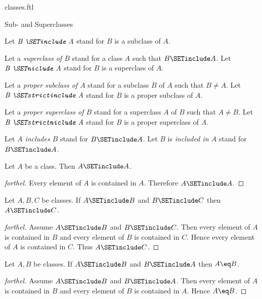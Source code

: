 \documentclass{naproche-library}
\begin{document}
\begin{smodule}[title=Classes]{classes.ftl}
\begin{sfragment}{Sub- and Superclasses}
\begin{definition}[forthel,id=FOUNDATIONS_01_3275578358628352]
    Let $\emph{B \SETinclude A}$ stand for $B$ is a subclass of $A$.

    Let a \emph{superclass of $B$} stand for a class $A$ such that $B \SETinclude A$.
    Let $\emph{B \SETniclude A}$ stand for $B$ is a superclass of $A$.

    Let a \emph{proper subclass of $A$} stand for a subclass $B$ of $A$ such that $B \neq A$.
    Let $\emph{B \SETstrictinclude A}$ stand for $B$ is a proper subclass of $A$.

    Let a \emph{proper superclass of $B$} stand for a superclass $A$ of $B$ such that $A \neq B$.
    Let $\emph{B \SETstrictniclude A}$ stand for $B$ is a proper superclass of $A$.

    Let \emph{$A$ includes $B$} stand for $B \SETinclude A$.
    Let $B$ is \emph{included in $A$} stand for $B \SETinclude A$.
  \end{definition}

  \begin{proposition}[forthel,id=FOUNDATIONS_01_5994555614691328]
    Let $A$ be a class.
    Then $A \SETinclude A$.
  \end{proposition}
  \begin{proof}[forthel]
    Every element of $A$ is contained in $A$.
    Therefore $A \SETinclude A$.
  \end{proof}

  \begin{proposition}[forthel,id=FOUNDATIONS_01_3939677545431040]
    Let $A, B, C$ be classes.
    If $A \SETinclude B$ and $B \SETinclude C$ then $A \SETinclude C$.
  \end{proposition}
  \begin{proof}[forthel]
    Assume $A \SETinclude B$ and $B \SETinclude C$.
    Then every element of $A$ is contained in $B$ and every element of $B$ is contained in $C$.
    Hence every element of $A$ is contained in $C$.
    Thus $A \SETinclude C$.
  \end{proof}

  \begin{proposition}[forthel,id=FOUNDATIONS_01_7159957847801856]
    Let $A, B$ be classes.
    If $A \SETinclude B$ and $B \SETinclude A$ then $A \eq B$.
  \end{proposition}
  \begin{proof}[forthel]
    Assume $A \SETinclude B$ and $B \SETinclude A$.
    Then every element of $A$ is contained in $B$ and every element of $B$ is contained in $A$.
    Hence $A \eq B$.
  \end{proof}
\end{sfragment}


\end{smodule}
\end{document}
